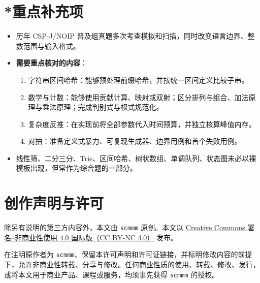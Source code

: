 \documentclass[a4paper,11pt]{article}
\begin{document}
\section{*重点补充项}

\begin{itemize}
  \item 历年 CSP-J/NOIP 普及组真题多次考查模拟和扫描，同时改变语言边界、整数范围与输入格式。
  \item \textbf{需要重点核对的内容}：
        \begin{enumerate}
          \item 字符串区间哈希：能够预处理前缀哈希，并按统一区间定义比较子串。
          \item 数学与计数：能够使用贡献计算、映射或双射；区分排列与组合、加法原理与乘法原理；完成判别式与根式规范化。
          \item 复杂度反推：在实现前将全部参数代入时间预算，并独立核算峰值内存。
          \item 对拍：准备定义式暴力、可复现生成器、边界用例和首个失败用例。
        \end{enumerate}
  \item 线性筛、二分三分、Trie、区间哈希、树状数组、单调队列、状态图未必以裸模板出现，但常作为综合题的一部分。
\end{itemize}

\medskip
\section*{创作声明与许可}

除另有说明的第三方内容外，本文由 \texttt{scmmm} 原创。本文以
\href{https://creativecommons.org/licenses/by-nc/4.0/deed.zh-hans}{Creative Commons 署名--非商业性使用 4.0 国际版（CC BY-NC 4.0）}
发布。

在注明原作者为 \texttt{scmmm}、保留本许可声明和许可证链接，并标明修改内容的前提下，允许非商业性转载、分享与修改。任何商业性质的使用、转载、修改、发行，或将本文用于商业产品、课程或服务，均须事先获得 \texttt{scmmm} 的授权。
\end{document}
